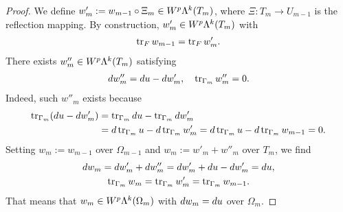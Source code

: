 \documentclass[12pt,a4paper]{article}
\begin{document}
\begin{proof}
    We define $w'_{m} := w_{m-1} \circ \Xi_{m} \in W^{p}\Lambda^{k}(T_{m})$,
    where $\Xi : T_{m} \rightarrow U_{m-1}$ is the reflection mapping. 
    By construction, $w'_{m} \in W^{p}\Lambda^{k}(T_{m})$ with 
    \begin{align*}
        \operatorname{tr}_F w_{m-1} = \operatorname{tr}_F w'_{m}
        .
    \end{align*}
    There exists $w''_{m} \in W^{p}\Lambda^{k}(T_{m})$ satisfying 
    \begin{align*}
        d w''_{m} = d u - d w'_{m}, 
        \quad 
        \operatorname{tr}_{\Gamma_{m}} w''_{m} = 0.
    \end{align*}
    Indeed, such $w''_{m}$ exists because 
    \begin{align*}
        \operatorname{tr}_{\Gamma_{m}}( d u - d w'_{m} ) 
        &= 
        \operatorname{tr}_{\Gamma_{m}} d u - \operatorname{tr}_{\Gamma_{m}} d w'_{m}
        \\&= 
        d \operatorname{tr}_{\Gamma_{m}} u - d \operatorname{tr}_{\Gamma_{m}} w'_{m}
        = 
        d \operatorname{tr}_{\Gamma_{m}} u - d \operatorname{tr}_{\Gamma_{m}} w_{m-1}
        = 
        0
        .
    \end{align*}
    Setting $w_{m} := w_{m-1}$ over $\Omega_{m-1}$ and $w_{m} := w'_{m} + w''_{m}$ over $T_{m}$, 
    we find 
    \begin{gather*}
        d w_{m} = d w'_{m} + d w''_{m} = d w'_{m} + d u - d w'_{m} = d u,
        \\
        \operatorname{tr}_{\Gamma_{m}} w_{m} = \operatorname{tr}_{\Gamma_{m}} w'_{m} = \operatorname{tr}_{\Gamma_{m}} w_{m-1}.
    \end{gather*}
    That means that $w_{m} \in W^{p}\Lambda^{k}(\Omega_{m})$ with $d w_{m} = d u$ over $\Omega_{m}$. 
    

\end{proof}
\end{document}
